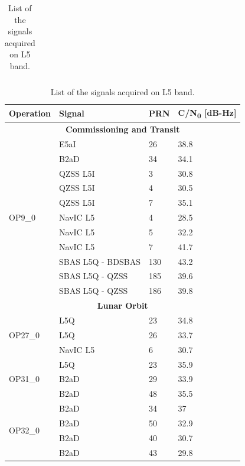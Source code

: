 \documentclass{IEEEtaes}
\begin{document}
\begin{table}[]
\begin{minipage}{0.48\textwidth}
\begin{tabular}{llll}
\end{tabular}
\vspace{3pt}

\end{minipage}
\hfill
\begin{minipage}{0.48\textwidth}
\caption{List of the signals acquired on L5 band. }
\label{tab:ACQRESULTSL5}
\centering
\begin{tabular}{llll}
\hline
\textbf{Operation} & \textbf{Signal} & \textbf{PRN} & \textbf{C/N\textsubscript{0} [dB-Hz]}\\ 
\hline
\multicolumn{4}{c}{\textbf{Commissioning and Transit}} \\
\hline
\multirow{11}{*}{OP9\_0}
 & E5aI            & 26           & 38.8 \\
 & B2aD            & 34           & 34.1 \\
 & QZSS L5I        & 3            & 30.8 \\
 & QZSS L5I        & 4            & 30.5 \\
 & QZSS L5I        & 7            & 35.1 \\
 & NavIC L5        & 4            & 28.5 \\
 & NavIC L5        & 5            & 32.2 \\
 & NavIC L5        & 7            & 41.7 \\
 & SBAS L5Q - BDSBAS & 130        & 43.2 \\
 & SBAS L5Q - QZSS  & 185        & 39.6 \\
 & SBAS L5Q - QZSS  & 186        & 39.8 \\
\midrule
\multicolumn{4}{c}{\textbf{Lunar Orbit}} \\
\hline
\multirow{3}{*}{OP27\_0}
 & L5Q             & 23           & 34.8 \\
 & L5Q             & 26           & 33.7 \\
 & NavIC L5        & 6            & 30.7 \\
\midrule
\multirow{3}{*}{OP31\_0}
 & L5Q             & 23           & 35.9 \\
 & B2aD            & 29           & 33.9 \\
 & B2aD            & 48           & 35.5 \\
\midrule
\multirow{5}{*}{OP32\_0}
 & B2aD            & 34           & 37 \\
 & B2aD            & 50           & 32.9 \\
 & B2aD            & 40           & 30.7 \\
 & B2aD            & 43           & 29.8 \\

\end{tabular}
\end{minipage}
\end{table}
\end{document}
